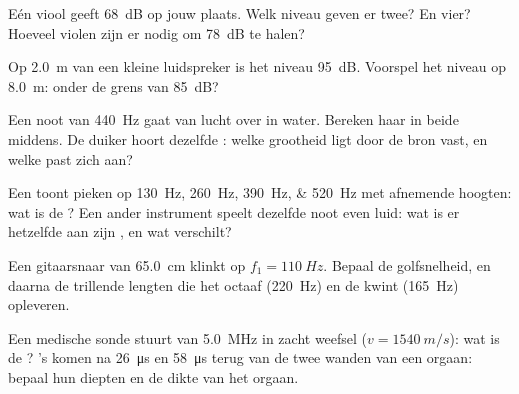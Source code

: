 \begin{exercise}[$\star\star$]\label{exo:g12:sound-acoustics:7}
Eén viool geeft \qty{68}{dB} op jouw plaats. Welk niveau geven er twee?
En vier? Hoeveel violen zijn er nodig om \qty{78}{dB} te halen?
\end{exercise}

\begin{exercise}[$\star\star$]\label{exo:g12:sound-acoustics:8}
Op \qty{2.0}{m} van een kleine luidspreker is het niveau \qty{95}{dB}.
Voorspel het niveau op \qty{8.0}{m}: onder de grens van \qty{85}{dB}?
\end{exercise}

\begin{exercise}[$\star\star$]\label{exo:g12:sound-acoustics:9}
Een noot van \qty{440}{Hz} gaat van lucht over in water. Bereken haar
 in beide middens. De duiker hoort dezelfde : welke
grootheid ligt door de bron vast, en welke past zich aan?
\end{exercise}

\begin{exercise}[$\star\star$]\label{exo:g12:sound-acoustics:10}
Een  toont pieken op \qtylist{130;260;390;520}{Hz} met afnemende
hoogten: wat is de ? Een ander instrument speelt dezelfde noot
even luid: wat is er hetzelfde aan zijn , en wat verschilt?
\end{exercise}

\begin{exercise}[$\star\star$]\label{exo:g12:sound-acoustics:11}
Een gitaarsnaar van \qty{65.0}{cm} klinkt op $f_1 = \qty{110}{Hz}$.
Bepaal de golfsnelheid, en daarna de trillende lengten die het octaaf
(\qty{220}{Hz}) en de kwint (\qty{165}{Hz}) opleveren.
\end{exercise}

\begin{exercise}[$\star\star\star$]\label{exo:g12:sound-acoustics:12}
Een medische sonde stuurt  van \qty{5.0}{MHz} in zacht weefsel
($v = \qty{1540}{m/s}$): wat is de ? 's komen na
\qty{26}{\micro s} en \qty{58}{\micro s} terug van de twee wanden van een
orgaan: bepaal hun diepten en de dikte van het orgaan.
\end{exercise}

